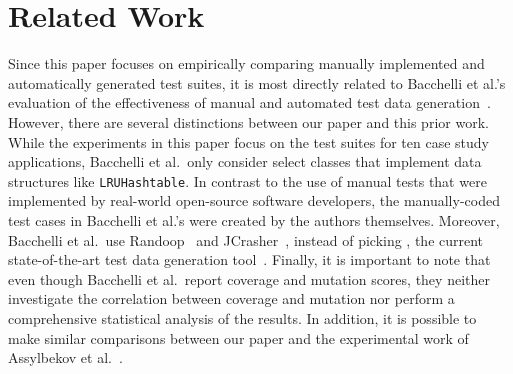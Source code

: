 
\section{Related Work} \label{sec:related_work}

Since this paper focuses on empirically comparing manually implemented and automatically generated test suites, it is most directly related to Bacchelli et al.'s evaluation of the effectiveness of manual and automated test data generation~\cite{bacchelli2008}. However, there are several distinctions between our paper and this prior work. While the experiments in this paper focus on the test suites for ten case study applications, Bacchelli et al.\ only consider select classes that implement data structures like {\tt LRUHashtable}. In contrast to the use of manual tests that were implemented by real-world open-source software developers, the manually-coded test cases in Bacchelli et al.'s were created by the authors themselves.  Moreover, Bacchelli et al.\ use Randoop~\cite{pacheco2007feedback} and JCrasher~\cite{csallner2004}, instead of picking \evo, the current state-of-the-art test data generation tool~\cite{fraser2013a}. Finally, it is important to note that even though Bacchelli et al.\ report coverage and mutation scores, they neither investigate the correlation between coverage and mutation nor perform a comprehensive statistical analysis of the results. In addition, it is possible to make similar comparisons between our paper and the experimental work of Assylbekov et al.~\cite{assylbekov2013}.





